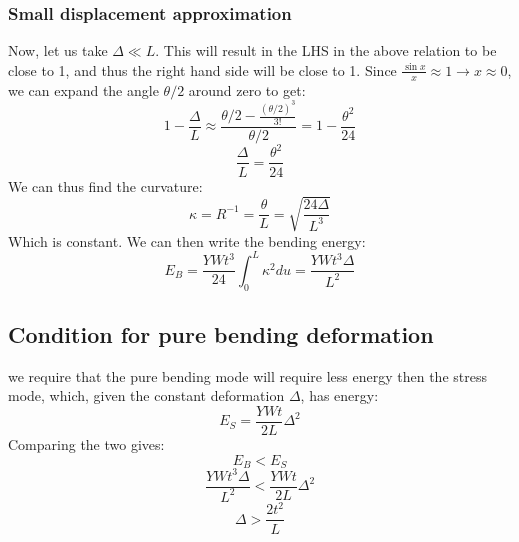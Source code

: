 \documentclass{article}
\begin{document}
\subsubsection{Small displacement approximation}
Now, let us take $\Delta \ll L$. This will result in the LHS in the above relation to be close to 1, and thus the right hand side will be close to 1. Since $\frac{\sin x}{x} \approx 1 \rightarrow x \approx 0$, we can expand the angle $\theta/2$ around zero to get:
\begin{equation}
    1 - \frac{\Delta}{L} \approx \frac{\theta/2 - \frac{(\theta/2)^3}{3!}}{\theta/2} = 1 - \frac{\theta^2}{24}
\end{equation}
\begin{equation}
    \boxed{\frac{\Delta}{L} = \frac{\theta^2}{24}}
\end{equation}
We can thus find the curvature:
\begin{equation}
    \kappa = R^{-1} = \frac{\theta}{L} = \sqrt{\frac{24\Delta}{L^3}}
\end{equation}
Which is constant. We can then write the bending energy:
\begin{equation}
    E_{B} = \frac{YWt^3}{24}\int_0^L \kappa^2 du = \boxed{\frac{YWt^3\Delta}{L^2}}
\end{equation}
\subsection{Condition for pure bending deformation}
we require that the pure bending mode will require less energy then the stress mode, which, given the constant deformation $\Delta$, has energy:
\begin{equation}
    E_{S} = \frac{YWt}{2L}\Delta^2
\end{equation}
Comparing the two gives:
\begin{equation}
    E_{B} < E_{S}
\end{equation}
\begin{equation}
    \frac{YWt^3\Delta}{L^2} < \frac{YWt}{2L}\Delta^2
\end{equation}
\begin{equation}
    \boxed{\Delta > \frac{2t^2}{L}}
\end{equation}
\end{document}
